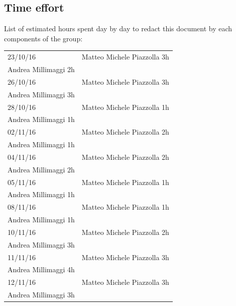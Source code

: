 \documentclass[english]{article}
\providecommand{\tabularnewline}{\\}
\begin{document}
\subsection{Time effort}
List of estimated hours spent day by day to redact this document by each components of the group:
	\begin{center}
	\begin{adjustbox}{max width=\textwidth}	
		\begin{tabular}{|l|>{\raggedright}p{15cm}|}
      \hline  23/10/16 & Matteo Michele Piazzolla 3h \\ Andrea Millimaggi 2h \tabularnewline
      \hline  26/10/16 & Matteo Michele Piazzolla 3h \\ Andrea Millimaggi 3h \tabularnewline
      \hline  28/10/16 & Matteo Michele Piazzolla 1h \\ Andrea Millimaggi 1h \tabularnewline
      \hline  02/11/16 & Matteo Michele Piazzolla 2h \\ Andrea Millimaggi 1h \tabularnewline
      \hline  04/11/16 & Matteo Michele Piazzolla 2h \\ Andrea Millimaggi 2h \tabularnewline
      \hline  05/11/16 & Matteo Michele Piazzolla 1h \\ Andrea Millimaggi 1h \tabularnewline
      \hline  08/11/16 & Matteo Michele Piazzolla 1h \\ Andrea Millimaggi 1h \tabularnewline
      \hline  10/11/16 & Matteo Michele Piazzolla 2h \\ Andrea Millimaggi 3h \tabularnewline
      \hline  11/11/16 & Matteo Michele Piazzolla 3h \\ Andrea Millimaggi 4h \tabularnewline
      \hline  12/11/16 & Matteo Michele Piazzolla 3h \\ Andrea Millimaggi 3h \tabularnewline
			\hline 
		\end{tabular}
	\end{adjustbox}
	\end{center}	
\end{document}
